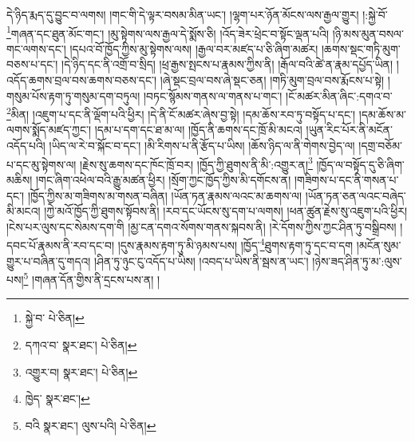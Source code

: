 དེ་ཉིད་རྨད་དུ་བྱུང་བ་ལགས། །གང་གི་དེ་ལྟར་བསམ་མིན་ཡང་། །ལྷག་པར་ཉོན་མོངས་ལས་རྒྱལ་གྱུར། །:སྐྱེ་བོ་\footnote{སྐྱེ་བ་  པེ་ཅིན། }གཞན་དང་ཐུན་མོང་གང་། །མུ་སྟེགས་ལས་རྒྱལ་དེ་སྨོས་ཅི། །འོད་ཟེར་ཕྲེང་བ་སྟོང་ལྡན་པའི། །ཉི་མས་མུན་བསལ་གང་ལགས་དང་། །དཔའ་བོ་ཁྱོད་ཀྱིས་མུ་སྟེགས་ལས། །རྒྱལ་བར་མཛད་པ་ཅི་ཞིག་མཚར། །ཆགས་སྡང་གཏི་མུག་བཅས་པ་དང་། །དེ་ཉིད་དང་ནི་འགྲོ་བ་སྲིད། །ཕྲ་རྒྱས་སྤངས་པ་རྣམས་ཀྱིས་ནི། །རྒོལ་བའི་ཚེ་ན་རྣམ་དཔྱོད་ཡིན། །འདོད་ཆགས་བྲལ་བས་ཆགས་བཅས་དང་། །ཞེ་སྡང་བྲལ་བས་ཞེ་སྡང་ཅན། །གཏི་མུག་བྲལ་བས་རྨོངས་པ་སྟེ། །གསུམ་པོས་རྟག་ཏུ་གསུམ་དག་བཏུལ། །བཏང་སྙོམས་གནས་ལ་གནས་པ་གང་། །ངོ་མཚར་མིན་ཞིང་:དགའ་བ་\footnote{དཀའ་བ་  སྣར་ཐང་།  པེ་ཅིན། }མིན། །འཇུག་པ་དང་ནི་ལྡོག་པའི་ཕྱིར། །དེ་ནི་ངོ་མཚར་ཞེས་བྱ་སྟེ། །དམ་ཆོས་རབ་ཏུ་བསྟོད་པ་དང་། །དམ་ཆོས་མ་ལགས་སྨོད་མཛད་ཀྱང་། །དམ་པ་དག་དང་ཐ་མ་ལ། །ཁྱོད་ནི་ཆགས་དང་ཁྲོ་མི་མངའ། །ཡུན་རིང་པོར་ནི་མངོན་འདོད་པའི། །ཡིད་ལ་རེ་བ་སྐོང་བ་དང་། །མི་རིགས་པ་ནི་རྩོད་པ་ཡིས། །ཆོས་ཉིད་ལ་ནི་གེགས་བྱེད་ལ། །དགྲ་བཅོམ་པ་དང་མུ་སྟེགས་ལ། །རྗེས་སུ་ཆགས་དང་ཁོང་ཁྲོ་བར། །ཁྱོད་ཀྱི་ཐུགས་ནི་མི་:འགྱུར་ན།\footnote{འགྱུར་བ།  སྣར་ཐང་།  པེ་ཅིན། } །ཁྱོད་ལ་བསྟོད་དུ་ཅི་ཞིག་མཆིས། །གང་ཞིག་འཕེལ་བའི་རྒྱུ་མཚན་ཕྱིར། །སྲོག་ཀྱང་ཁྱོད་ཀྱིས་མི་དགོངས་ན། །གཟིགས་པ་དང་ནི་གསན་པ་དང་། །ཁྱོད་ཀྱིས་མ་གཟིགས་མ་གསན་བཞིན། །ཡོན་ཏན་རྣམས་ལའང་མ་ཆགས་ལ། །ཡོན་ཏན་ཅན་ལའང་བཞེད་མི་མངའ། །ཀྱེ་མའོ་ཁྱོད་ཀྱི་ཐུགས་སྟོབས་ནི། །རབ་དང་ཡོངས་སུ་དག་པ་ལགས། །ཕན་ཚུན་རྗེས་སུ་འཇུག་པའི་ཕྱིར། །ངེས་པར་ལུས་དང་སེམས་དག་གི །མྱ་ངན་དགའ་སོགས་གནས་སྐབས་ནི། །རེ་དོགས་ཀྱིས་ཀྱང་ཤིན་ཏུ་བསྒྲིབས། །དབང་པོ་རྣམས་ནི་རབ་དང་བ། །དུས་རྣམས་རྟག་ཏུ་མི་ཉམས་པས། །ཁྱོད་\footnote{ཁྱེད་  སྣར་ཐང་། }ཐུགས་རྟག་ཏུ་དང་བ་དག །མངོན་སུམ་གྱུར་པ་བཞིན་དུ་གདའ། །ཤིན་ཏུ་ཉུང་ངུ་འདོད་པ་ཡིས། །འབད་པ་ཡིས་ནི་སྦས་ན་ཡང་། །ཉེས་ཟད་ཤིན་ཏུ་མ་:ལུས་པས།\footnote{བའི  སྣར་ཐང་། ལུས་པའི།  པེ་ཅིན། } །གཞན་དོན་གྱིས་ནི་དྲངས་པས་ན། །
